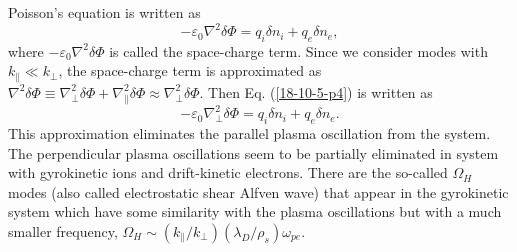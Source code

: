 \documentclass{llncs}
\begin{document}
Poisson's equation is written as
\begin{equation}
  \label{18-10-5-p4} - \varepsilon_0 \nabla^2 \delta \Phi = q_i \delta n_i +
  q_e \delta n_e,
\end{equation}
where $- \varepsilon_0 \nabla^2 \delta \Phi$ is called the space-charge term.
Since we consider modes with $k_{\parallel} \ll k_{\perp}$, the space-charge
term is approximated as $\nabla^2 \delta \Phi \equiv \nabla^2_{\perp} \delta
\Phi + \nabla^2_{\parallel} \delta \Phi \approx \nabla^2_{\perp} \delta \Phi$.
Then Eq. (\ref{18-10-5-p4}) is written as
\begin{equation}
  \label{19-1-12-e2} - \varepsilon_0 \nabla^2_{\perp} \delta \Phi = q_i \delta
  n_i + q_e \delta n_e .
\end{equation}
This approximation eliminates the parallel plasma oscillation from the system.
The perpendicular plasma oscillations seem to be partially eliminated in
system with gyrokinetic ions and drift-kinetic electrons. There are the
so-called $\Omega_H$ modes (also called electrostatic shear Alfven wave) that
appear in the gyrokinetic system which have some similarity with the plasma
oscillations but with a much smaller frequency, $\Omega_H \sim (k_{\parallel}
/ k_{\perp}) (\lambda_D / \rho_s) \omega_{p e}$.
\end{document}
